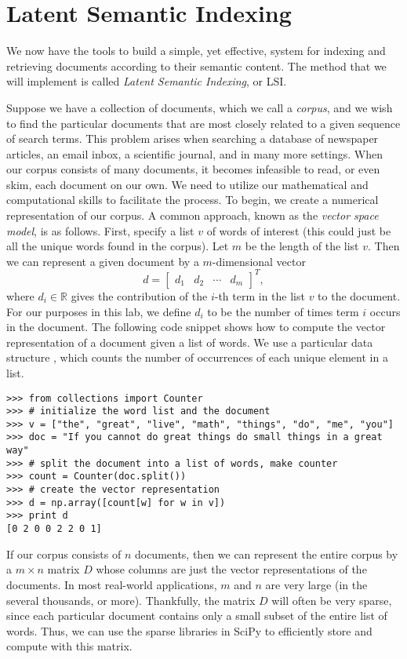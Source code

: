 \section*{Latent Semantic Indexing}
We now have the tools to build a simple, yet effective, system for indexing and retrieving documents according to their semantic content.
The method that we will implement is called \emph{Latent Semantic Indexing}, or LSI.

Suppose we have a collection of documents, which we call a \emph{corpus}, and we wish to find the particular documents
that are most closely related to a given sequence of search terms. 
This problem arises when searching a database of newspaper articles, an email inbox, a scientific journal, and in many more settings. 
When our corpus consists of many documents, it becomes infeasible to read, or even skim, each document on our own. 
We need to utilize our mathematical and computational skills to facilitate the process.
To begin, we create a numerical representation of our corpus. 
A common approach, known as the \emph{vector space model}, is as follows. 
First, specify a list $v$ of words of interest (this could just be all the unique words found in the corpus).
Let $m$ be the length of the list $v$. Then we can represent a given document by a $m$-dimensional vector 
\[
d = \begin{bmatrix}
d_1 & d_2 & \cdots & d_m
\end{bmatrix}^T,
\]
where $d_i \in \mathbb{R}$ gives the contribution of the $i$-th term in the list $v$ to the document. 
For our purposes in this lab, we define $d_i$ to be the number of times term $i$ occurs in the document.
The following code snippet shows how to compute the vector representation of a document given a list of words.
We use a particular data structure , which counts the number of occurrences of each unique element in a list.
\begin{lstlisting}
>>> from collections import Counter
>>> # initialize the word list and the document
>>> v = ["the", "great", "live", "math", "things", "do", "me", "you"]
>>> doc = "If you cannot do great things do small things in a great way"
>>> # split the document into a list of words, make counter
>>> count = Counter(doc.split())
>>> # create the vector representation
>>> d = np.array([count[w] for w in v])
>>> print d
[0 2 0 0 2 2 0 1]
\end{lstlisting}
If our corpus consists of $n$ documents, then we can represent the entire corpus by a $m \times n$ matrix
$D$ whose columns are just the vector representations of the documents. 
In most real-world applications, $m$ and $n$ are very large (in the several thousands, or more). 
Thankfully, the matrix $D$ will often be very sparse, since each particular document contains only a small subset
of the entire list of words.
Thus, we can use the sparse libraries in SciPy to efficiently store and compute with this matrix.

